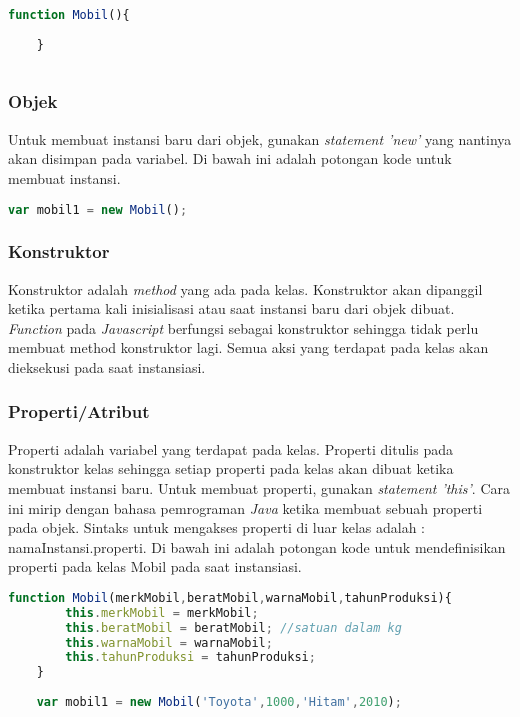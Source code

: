 \begin{lstlisting}[language=Javascript, caption=Membuat kelas Mobil]
	function Mobil(){
	
	}
	
\end{lstlisting}

\subsubsection{Objek}
Untuk membuat instansi baru dari objek, gunakan \textit{statement 'new'} yang nantinya akan disimpan pada variabel. Di bawah ini adalah potongan kode untuk membuat instansi.

\begin{lstlisting}[language=Javascript, caption=Membuat \textit{instance} mobil]
	var mobil1 = new Mobil();
\end{lstlisting}

\subsubsection{Konstruktor}
Konstruktor adalah \textit{method} yang ada pada kelas. Konstruktor akan dipanggil ketika pertama kali inisialisasi atau saat instansi baru dari objek dibuat. \textit{Function} pada \textit{Javascript} berfungsi sebagai konstruktor sehingga tidak perlu membuat method konstruktor lagi. Semua aksi yang terdapat pada kelas akan dieksekusi pada saat instansiasi.

\subsubsection{Properti/Atribut}
Properti adalah variabel yang terdapat pada kelas. Properti ditulis pada konstruktor kelas sehingga setiap properti pada kelas akan dibuat ketika membuat instansi baru. Untuk membuat properti, gunakan \textit{statement 'this'}. Cara ini mirip dengan bahasa pemrograman \textit{Java} ketika membuat sebuah properti pada objek. Sintaks untuk mengakses properti di luar kelas adalah : namaInstansi.properti. Di bawah ini adalah potongan kode untuk mendefinisikan properti pada kelas Mobil pada saat instansiasi.

\begin{lstlisting}[language=Javascript, caption=Mendefinisikan properti pada kelas Mobil]
	function Mobil(merkMobil,beratMobil,warnaMobil,tahunProduksi){
		this.merkMobil = merkMobil;
		this.beratMobil = beratMobil; //satuan dalam kg
		this.warnaMobil = warnaMobil;
		this.tahunProduksi = tahunProduksi;
	}
	
	var mobil1 = new Mobil('Toyota',1000,'Hitam',2010);
	
\end{lstlisting}

